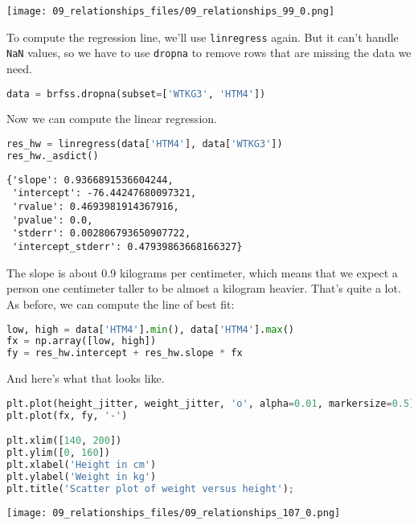 \begin{center}
\texttt{[image: 09\_relationships\_files/09\_relationships\_99\_0.png]}
\end{center}

To compute the regression line, we'll use
\passthrough{\lstinline!linregress!} again. But it can't handle
\passthrough{\lstinline!NaN!} values, so we have to use
\passthrough{\lstinline!dropna!} to remove rows that are missing the
data we need.

\begin{lstlisting}[language=Python,style=source]
data = brfss.dropna(subset=['WTKG3', 'HTM4'])
\end{lstlisting}

Now we can compute the linear regression.

\begin{lstlisting}[language=Python,style=source]
res_hw = linregress(data['HTM4'], data['WTKG3'])
res_hw._asdict()
\end{lstlisting}

\begin{lstlisting}[style=output]
{'slope': 0.9366891536604244,
 'intercept': -76.44247680097321,
 'rvalue': 0.4693981914367916,
 'pvalue': 0.0,
 'stderr': 0.002806793650907722,
 'intercept_stderr': 0.47939863668166327}
\end{lstlisting}

The slope is about 0.9 kilograms per centimeter, which means that we
expect a person one centimeter taller to be almost a kilogram heavier.
That's quite a lot. As before, we can compute the line of best fit:

\begin{lstlisting}[language=Python,style=source]
low, high = data['HTM4'].min(), data['HTM4'].max()
fx = np.array([low, high])
fy = res_hw.intercept + res_hw.slope * fx
\end{lstlisting}

And here's what that looks like.

\begin{lstlisting}[language=Python,style=source]
plt.plot(height_jitter, weight_jitter, 'o', alpha=0.01, markersize=0.5)
plt.plot(fx, fy, '-')

plt.xlim([140, 200])
plt.ylim([0, 160])
plt.xlabel('Height in cm')
plt.ylabel('Weight in kg')
plt.title('Scatter plot of weight versus height');
\end{lstlisting}

\begin{center}
\texttt{[image: 09\_relationships\_files/09\_relationships\_107\_0.png]}
\end{center}

